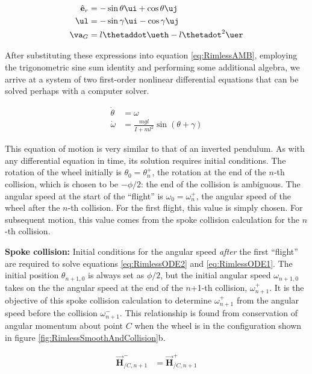 \begin{align}
\hat{\mathbf{e}}_{r} &= - \sin{\theta} \ui + \cos{\theta} \uj \\
\ul &=  - \sin{\gamma} \ui - \cos{\gamma} \uj \\
\va_{G} &= l \thetaddot \ueth - l \thetadot^{2} \uer
\end{align}

After substituting these expressions into equation \ref{eq:RimlessAMB}, employing the trigonometric sine sum identity and performing some additional algebra, we arrive at a system of two first-order nonlinear differential equations that can be solved perhaps with a computer solver.

\begin{align}
\dot{\theta} &= \omega \label{eq:RimlessODE2} \\
\dot{\omega} &= \frac{mgl}{I + m l^2} \sin(\theta + \gamma) \label{eq:RimlessODE1}
\end{align}

This equation of motion is very similar to that of an inverted pendulum. As with any differential equation in time, its solution requires initial conditions. The rotation of the wheel initially is $\theta_{0} = \theta_n^{+}$, the rotation at the end of the $n$-th collision, which is chosen to be $-\phi/2$: the end of the collision is ambiguous. The angular speed at the start of the ``flight'' is $\omega_{0} = \omega_{n}^{+}$, the angular speed of the wheel after the $n$-th collision. For the first flight, this value is simply chosen. For subsequent motion, this value comes from the spoke collision calculation for the $n$-th collision.

\textbf{Spoke collision:} Initial conditions for the angular speed \emph{after} the first ``flight'' are required to solve equations \ref{eq:RimlessODE2} and \ref{eq:RimlessODE1}. The initial position $\theta_{n+1,0}$ is always set as $\phi/2$, but the initial angular speed $\omega_{n+1,0}$ takes on the the angular speed at the end of the $n$+1-th collision, $\omega_{n+1}^{+}$. It is the objective of this spoke collision calculation to determine $\omega_{n+1}^{+}$ from the angular speed before the collision $\omega_{n+1}^{-}$. This relationship is found from conservation of angular momentum about point $C$ when the wheel is in the configuration shown in figure \ref{fig:RimlessSmoothAndCollision}b.

\begin{align}
\vec{\mathbf{H}}_{/C,n+1}^{-} &= \vec{\mathbf{H}}_{/C,n+1}^{+}
\label{eq:RimlessAM}
\end{align}

